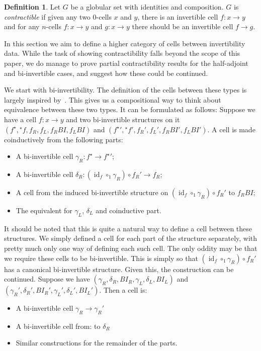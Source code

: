 \documentclass{article}
\theoremstyle{definition}
\newtheorem{definition}{Definition}
\theoremstyle{remark}
\DeclareMathOperator{\id}{id}
\newcommand{\linv}[1]{{}^\star\!#1}
\newcommand{\rinv}[1]{#1^\star}
\begin{document}
\begin{definition}
  Let \(G\) be a globular set with identities and composition. \(G\) is \emph{contractible} if given any two \(0\)-cells \(x\) and \(y\), there is an invertible cell \(f : x \to y\) and for any \(n\)-cells \(f : x \to y\) and \(g : x \to y\) there should be an invertible cell \(f \to g\).
\end{definition}

In this section we aim to define a higher category of cells between invertibility data. While the task of showing contractibility falls beyond the scope of this paper, we do manage to prove partial contractibility results for the half-adjoint and bi-invertible cases, and suggest how these could be continued.

We start with bi-invertibility. The definition of the cells between these types is largely inspired by~\cite[Lemma 4.2.5]{hottbook}. This gives us a compositional way to think about equivalence between these two types. It can be formulated as follows: Suppose we have a cell \(f : x \to y\) and two bi-invertible structures on it \((\rinv f, \linv f, f_R, f_L, f_R{}BI, f_L{}BI)\) and \((\rinv f{}' , \linv f{}', f_R', f_L', f_R{}BI', f_L{}BI')\). A cell is made coinductively from the following parts:
\begin{itemize}
\item A bi-invertible cell \(\gamma_R : \rinv f \to \rinv f{}'\);
\item A bi-invertible cell \(\delta_R : (\id_f \circ_1 \gamma_R) \circ f_R' \to f_R\);
\item A cell from the induced bi-invertible structure on \((\id_f \circ_1 \gamma_R) \circ f_R'\) to \(f_R{}BI\);
\item The equivalent for \(\gamma_L\), \(\delta_L\) and coinductive part.
\end{itemize}

It should be noted that this is quite a natural way to define a cell between these structures. We simply defined a cell for each part of the structure separately, with pretty much only one way of defining each such cell. The only oddity may be that we require these cells to be bi-invertible. This is simply so that \((\id_f \circ_1 \gamma_R) \circ f_R'\) has a canonical bi-invertible structure. Given this, the construction can be continued. Suppose we have \((\gamma_R, \delta_R, BI_R, \gamma_L, \delta_L, BI_L)\) and \((\gamma_R', \delta_R', BI_R', \gamma_L', \delta_L', BI_L')\). Then a cell is:
\begin{itemize}
\item A bi-invertible cell \(\gamma_R \to \gamma_R'\)
\item A bi-invertible cell from:
  to \(\delta_R\)
\item Similar constructions for the remainder of the parts.
\end{itemize}
\end{document}
